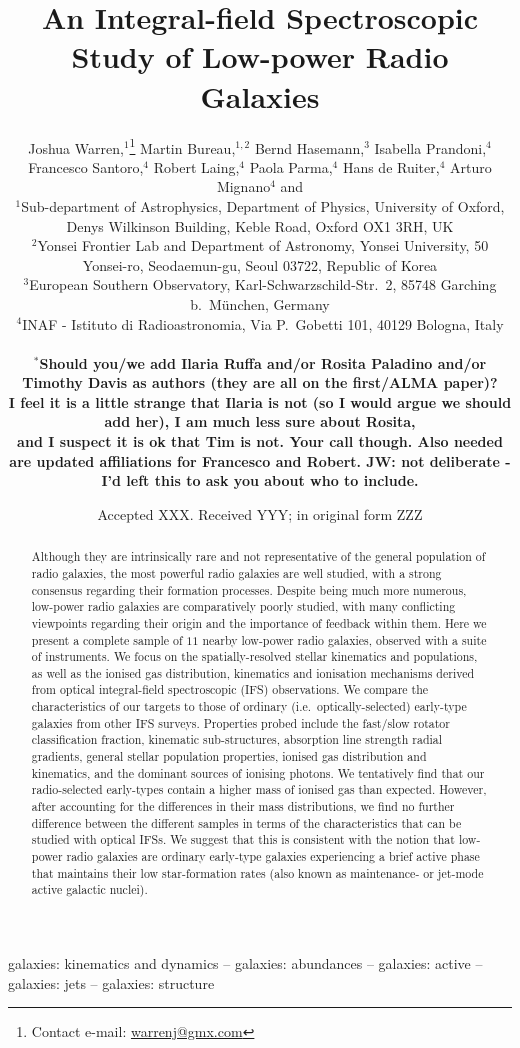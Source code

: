 \documentclass[a4paper,fleqn,usenatbib]{mnras}
\title[IFS Study of Low-power Radio Galaxies]{An Integral-field
  Spectroscopic Study of Low-power Radio Galaxies}
\author[J. Warren et al.]{
  Joshua Warren,$^{1}$\thanks{Contact e-mail:
    \href{mailto:warrenj@gmx.com}{warrenj@gmx.com}}
  Martin Bureau,$^{1,2}$ Bernd Hasemann,$^{3}$ \added{Ilaria Ruffa,$^{4}$} Isabella
  Prandoni,$^{4}$ \newauthor Francesco Santoro,$^{4}$ Robert
  Laing,$^{4}$ Paola Parma,$^{4}$ \added{Rosita Paladino,$^{4}$} Hans de Ruiter,$^{4}$ \newauthor
  Arturo Mignano$^{4}$ and \added{Timothy Davis$^{5}$}
  \\
  $^{1}$Sub-department of Astrophysics, Department of Physics,
  University of Oxford, Denys Wilkinson Building, Keble Road, Oxford
  OX1 3RH, UK\\
  $^{2}$Yonsei Frontier Lab and Department of Astronomy, Yonsei
  University, 50 Yonsei-ro, Seodaemun-gu, Seoul 03722, Republic of
  Korea\\
  $^{3}$European Southern Observatory, Karl-Schwarzschild-Str.\ 2,
  85748 Garching b.\ M{\"u}nchen, Germany\\
  $^{4}$INAF - Istituto di Radioastronomia, Via P.\ Gobetti 101, 40129
  Bologna, Italy\\
  \added{$^{5}$School of Physics \& Astronomy, Cardiff University, Queens Buildings, The Parade, Cardiff CF24 3AA, UK}\\
  $^*${\bf Should you/we add Ilaria Ruffa and/or Rosita Paladino
    and/or Timothy Davis as authors (they are all on the first/ALMA
    paper)?}\\{\bf I feel it is a little strange that Ilaria is not (so I
    would argue we should add her), I am much less sure about
    Rosita,}\\ {\bf and I suspect it is ok that Tim is not. Your call
    though. Also needed are updated affiliations for Francesco and
    Robert. JW: not deliberate - I'd left this to ask you about who to include.}}
\date{Accepted XXX. Received YYY; in original form ZZZ}
\begin{document}
\label{firstpage}
\pagerange{\pageref{firstpage}--\pageref{lastpage}}
\maketitle

\begin{abstract}
  Although they are intrinsically rare and not representative of the
  general population of radio galaxies, the most powerful radio
  galaxies are well studied, with a strong consensus regarding their
  formation processes. Despite being much more numerous, low-power
  radio galaxies are comparatively poorly studied, with many
  conflicting viewpoints regarding their origin and the importance of
  feedback within them. Here we present a complete sample of $11$
  nearby low-power radio galaxies, observed with a suite of
  instruments. We focus on the spatially-resolved stellar kinematics
  and populations, as well as the ionised gas distribution, kinematics
  and ionisation mechanisms derived from optical integral-field
  spectroscopic (IFS) observations.
  We compare the characteristics of our targets to those of ordinary
  (i.e.\ optically-selected) early-type galaxies from other IFS
  surveys.
  Properties probed include the fast/slow rotator classification
  fraction, kinematic sub-structures, absorption line strength radial
  gradients, general stellar population properties, ionised gas
  distribution and kinematics, and the dominant sources of ionising
  photons. We tentatively find that our radio-selected early-types
  contain a higher mass of ionised gas than expected. However, after
  accounting for the differences in their mass distributions, we find
  no further difference between the different samples in terms of the
  characteristics that can be studied with optical IFSs. We suggest
  that this is consistent with the notion that low-power radio
  galaxies are ordinary early-type galaxies experiencing a brief
  active phase that maintains their low star-formation rates (also
  known as maintenance- or jet-mode active galactic nuclei).
\end{abstract}

\begin{keywords}
galaxies: kinematics and dynamics -- galaxies: abundances -- galaxies: active -- galaxies: jets -- galaxies: structure
\end{keywords}
\end{document}
